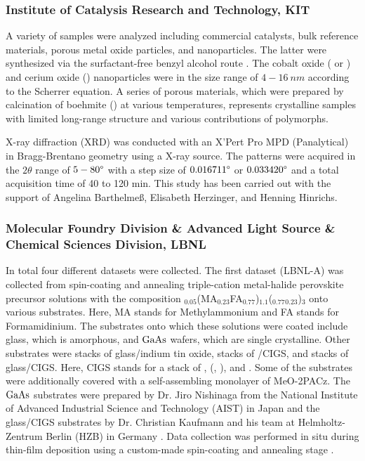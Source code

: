 \subsubsection*{Institute of Catalysis Research and Technology, KIT}

A variety of samples were analyzed including commercial catalysts, bulk reference materials, porous metal oxide particles, and nanoparticles. The latter were synthesized via the surfactant-free benzyl alcohol route \cite{Wolf2019, Wolf2018}. The cobalt oxide ( or ) and cerium oxide () nanoparticles were in the size range of $4-16 \ \si{nm}$ according to the Scherrer equation. A series of porous  materials, which were prepared by calcination of boehmite () at various temperatures, represents crystalline samples with limited long-range structure and various contributions of  polymorphs.

X-ray diffraction (XRD) was conducted with an X’Pert Pro MPD (Panalytical) in Bragg-Brentano geometry using a  X-ray source. The patterns were acquired in the $2\theta$ range of $5-80\degree$ with a step size of $0.016711\degree$ or $0.033420\degree$ and a total acquisition time of 40 to 120 min. This study has been carried out with the support of Angelina Barthelmeß, Elisabeth Herzinger, and Henning Hinrichs.

\subsubsection*{Molecular Foundry Division \& Advanced Light Source \& Chemical Sciences Division, LBNL}

In total four different datasets were collected. The first dataset (LBNL-A) was collected from spin-coating and annealing triple-cation metal-halide perovskite precursor solutions with the composition $_{0.05}$(MA$_{0.23}$FA$_{0.77}$)$_{1.1}$($_{0.77}$$_{0.23}$)$_{3}$ onto various substrates. Here, MA stands for Methylammonium and FA stands for Formamidinium. The substrates onto which these solutions were coated include glass, which is amorphous, and $\ce{GaAs}$ wafers, which are single crystalline. Other substrates were stacks of glass/indium tin oxide, stacks of /CIGS, and stacks of glass/CIGS. Here, CIGS stands for a stack of , (, ), and . Some of the substrates were additionally covered with a self-assembling monolayer of MeO-2PACz. The $\ce{GaAs}$ substrates were prepared by Dr. Jiro Nishinaga from the National Institute of Advanced Industrial Science and Technology (AIST) in Japan \cite{nishinaga2018} and the glass/CIGS substrates by Dr. Christian Kaufmann and his team at Helmholtz-Zentrum Berlin (HZB) in Germany \cite{heinemann2017}. Data collection was performed in situ during thin-film deposition using a custom-made spin-coating and annealing stage \cite{song2019}. 

